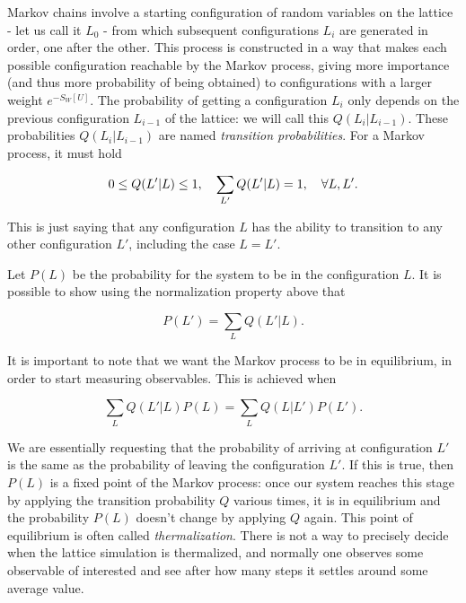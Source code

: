 \documentclass[reqno,12pt]{article}
\numberwithin{equation}{section}
\begin{document}
Markov chains involve a starting configuration of random variables on the
lattice - let us call it $L_0$ - from which subsequent configurations $L_i$ are generated in order, one after the other.
This process is constructed in a way that makes each possible configuration reachable by the Markov process, giving more
importance (and thus more probability of being obtained) to configurations with a larger weight $e^{-S_W[U]}$. The 
probability of getting a configuration $L_i$ only depends on the previous configuration $L_{i-1}$ of the lattice:
we will call this $Q(L_i|L_{i-1})$. These probabilities $Q(L_i|L_{i-1})$ are named \textit{transition probabilities}.
For a Markov process, it must hold

\begin{equation}
	0 \le Q(L'| L) \le 1 \qc \sum_{L'} Q(L'|L) = 1 \qc \forall L,L'. 
\end{equation}

This is just saying that any configuration $L$ has the ability to transition to any other configuration $L'$, including
the case $L = L'$.

Let $P(L)$ be the probability for the system to be in the configuration $L$. It is possible to show using the normalization
property above that

\begin{equation}
	P(L') = \sum_L Q(L' | L).
\end{equation}

It is important to note that we want the Markov process to be in equilibrium, in order to start measuring observables.
This is achieved when 

\begin{equation} \label{eq:balance_equation}
	\sum_L Q(L'| L) P(L) = \sum_L Q(L| L') P(L').
\end{equation}

We are essentially requesting that the probability of arriving at configuration $L'$ is the same as the probability
of leaving the configuration $L'$. If this is true, then $P(L)$ is a fixed point of the Markov process: once our system
reaches this stage by applying the transition probability $Q$ various times, it is in equilibrium and 
the probability $P(L)$ doesn't change by applying $Q$ again. This point of equilibrium is often called \textit{thermalization}.
There is not a way to precisely decide
when the lattice simulation is thermalized, and normally one observes some observable of interested and see after how many
steps it settles around some average value.
\end{document}
